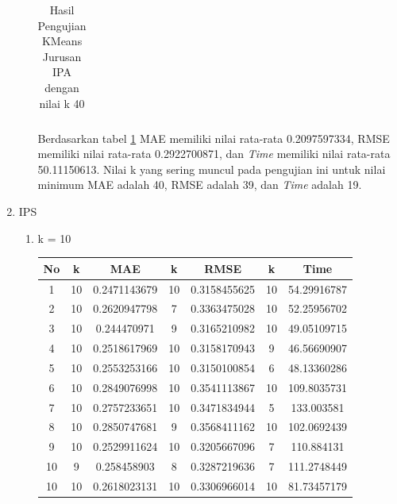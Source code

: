 \begin{enumerate}
\begin{enumerate}
\begin{longtable}[H]{|c|c|c|c|c|c|c|}
                        \caption{Hasil Pengujian KMeans Jurusan IPA dengan nilai k 40}
                        \label{tab:ipa k = 40}
                    \end{longtable}
                \endgroup
                
                Berdasarkan tabel \ref{tab:ipa k = 40} MAE memiliki nilai rata-rata 0.2097597334, RMSE memiliki nilai rata-rata 0.2922700871, dan \textit{Time} memiliki nilai rata-rata 50.11150613. Nilai k yang sering muncul pada pengujian ini untuk nilai minimum MAE adalah 40, RMSE adalah 39, dan \textit{Time} adalah 19.
                
        \end{enumerate}
        
        
        
    \item IPS
        \begin{enumerate}
            \item k = 10 \\
                \begingroup
                \renewcommand\arraystretch{1.5}
                    \begin{longtable}[H]{|c|c|c|c|c|c|c|}
                        \hline
                        No & k & MAE & k & RMSE & k & Time \\
                        \hline
                        1 & 10 & 0.2471143679 & 10 & 0.3158455625 & 10 & 54.29916787\\
                        \hline
                        2 & 10 & 0.2620947798 & 7 & 0.3363475028 & 10 & 52.25956702\\
                        \hline
                        3 & 10 & 0.244470971 & 9 & 0.3165210982 & 10 & 49.05109715\\
                        \hline
                        4 & 10 & 0.2518617969 & 10 & 0.3158170943 & 9 & 46.56690907\\
                        \hline
                        5 & 10 & 0.2553253166 & 10 & 0.3150100854 & 6 & 48.13360286\\
                        \hline
                        6 & 10 & 0.2849076998 & 10 & 0.3541113867 & 10 & 109.8035731\\
                        \hline
                        7 & 10 & 0.2757233651 & 10 & 0.3471834944 & 5 & 133.003581\\ 
                        \hline
                        8 & 10 & 0.2850747681 & 9 & 0.3568411162 & 10 & 102.0692439\\
                        \hline
                        9 & 10 & 0.2529911624 & 10 & 0.3205667096 & 7 & 110.884131\\
                        \hline
                        10 & 9 & 0.258458903 & 8 & 0.3287219636 & 7 & 111.2748449\\
                        \hline
                        10 & 10 & 0.2618023131 & 10 & 0.3306966014 & 10 & 81.73457179\\
                        \hline
                        

\end{longtable}
\end{enumerate}
\end{enumerate}
